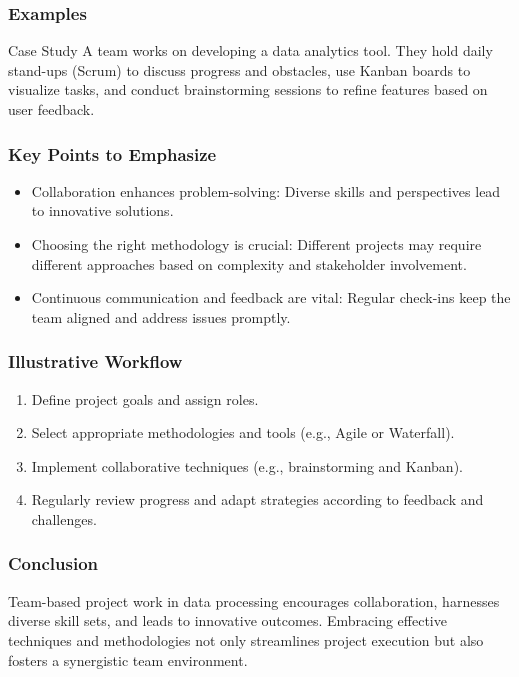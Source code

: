 \documentclass{beamer}
\begin{document}
\begin{frame}[fragile]
    \frametitle{Examples}
    \begin{block}{Case Study}
        A team works on developing a data analytics tool. They hold daily stand-ups (Scrum) to discuss progress and obstacles, use Kanban boards to visualize tasks, and conduct brainstorming sessions to refine features based on user feedback.
    \end{block}
\end{frame}

\begin{frame}[fragile]
    \frametitle{Key Points to Emphasize}
    \begin{itemize}
        \item Collaboration enhances problem-solving: Diverse skills and perspectives lead to innovative solutions.
        \item Choosing the right methodology is crucial: Different projects may require different approaches based on complexity and stakeholder involvement.
        \item Continuous communication and feedback are vital: Regular check-ins keep the team aligned and address issues promptly.
    \end{itemize}
\end{frame}

\begin{frame}[fragile]
    \frametitle{Illustrative Workflow}
    \begin{enumerate}
        \item Define project goals and assign roles.
        \item Select appropriate methodologies and tools (e.g., Agile or Waterfall).
        \item Implement collaborative techniques (e.g., brainstorming and Kanban).
        \item Regularly review progress and adapt strategies according to feedback and challenges.
    \end{enumerate}
\end{frame}

\begin{frame}[fragile]
    \frametitle{Conclusion}
    Team-based project work in data processing encourages collaboration, harnesses diverse skill sets, and leads to innovative outcomes. Embracing effective techniques and methodologies not only streamlines project execution but also fosters a synergistic team environment.
\end{frame}
\end{document}
